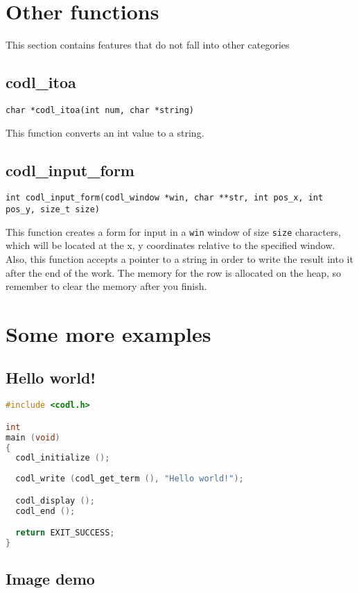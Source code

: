 \documentclass{article}
\newcommand{\fstep}{\vspace{3mm}\noindent}
\begin{document}
\section{Other functions}
This section contains features that do not fall into other categories

\subsection{codl\_itoa}
{\tt char *codl\_itoa(int num, char *string)}

\fstep{} This function converts an int value to a string.

\subsection{codl\_input\_form}
{\tt int codl\_input\_form(codl\_window *win, char **str, int pos\_x, int pos\_y, size\_t size)}

\fstep{} This function creates a form for input in a {\tt win} window of size {\tt size}
characters, which will be located at the x, y coordinates relative to the specified
window. Also, this function accepts a pointer to a string in order to write the
result into it after the end of the work. The memory for the row is allocated on
the heap, so remember to clear the memory after you finish.

\newpage

\section{Some more examples}

\subsection{Hello world!}

\begin{lstlisting}[language=C]
#include <codl.h>

int
main (void)
{
  codl_initialize ();
  
  codl_write (codl_get_term (), "Hello world!");

  codl_display ();
  codl_end ();

  return EXIT_SUCCESS;
}
\end{lstlisting}

\subsection{Image demo}
\end{document}
